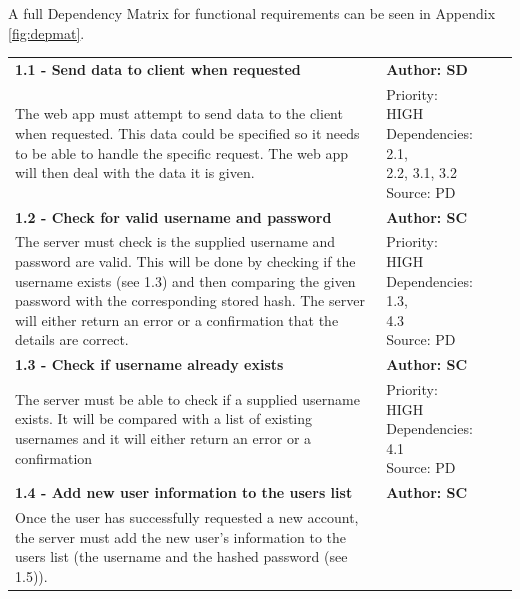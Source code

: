 \documentclass[10pt, notitlepage]{report}
\begin{document}
A full Dependency Matrix for functional requirements can be seen in Appendix \ref{fig:depmat}.
\begin{center}
\begin{longtable}{| p{13cm} | p{3cm} |}
\endfirsthead
\endlastfoot

\multicolumn{2}{c}{\textit{Continued from last page}}
\endhead

\multicolumn{2}{c}{\textit{Continued on next page}}
\endfoot

\hline
\multicolumn{2}{|l|}{\textbf{\textit{1 - Server}}} \\
\hline
\textbf{1.1 - Send data to client when requested} & \textbf{Author: SD} \\
\hline
The web app must attempt to send data to the client when requested. This data could be specified so it needs to be able to handle the specific request. The web app will then deal with the data it is given. & 
\makecell{Priority: HIGH \\ Dependencies: 2.1, \\2.2, 3.1, 3.2 \\ Source: PD}\\
\hline
\textbf{1.2 - Check for valid username and password} & \textbf{Author: SC} \\
\hline
The server must check is the supplied username and password are valid. This will be done by checking if the username exists (see 1.3) and then comparing the given password with the corresponding stored hash. The server will either return an error or a confirmation that the details are correct. &
\makecell{Priority: HIGH \\ Dependencies: 1.3, \\4.3 \\Source: PD}\\
\hline
\textbf{1.3 - Check if username already exists} & \textbf{Author: SC} \\
\hline
The server must be able to check if a supplied username exists. It will be compared with a list of existing usernames and it will either return an error or a confirmation &
\makecell{Priority: HIGH\\Dependencies: 4.1\\Source: PD}\\
\hline
\textbf{1.4 - Add new user information to the users list} & \textbf{Author: SC} \\
\hline
Once the user has successfully requested a new account, the server must add the new user’s information to the users list (the username and the hashed password (see 1.5)). &

\end{longtable}
\end{center}
\end{document}
